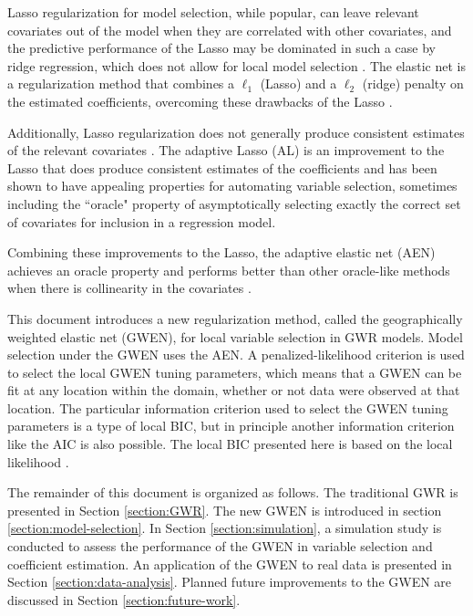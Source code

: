 \documentclass[authoryear, review, 11pt]{elsarticle}
\begin{document}
	Lasso regularization for model selection, while popular, can leave relevant covariates out of the model when they are correlated with other covariates, and the predictive performance of the Lasso may be dominated in such a case by ridge regression, which does not allow for local model selection \citep{Tibshirani:1996}. The elastic net is a regularization method that combines a $\ell_1$ (Lasso) and a $\ell_2$ (ridge) penalty on the estimated coefficients, overcoming these drawbacks of the Lasso \citep{Zou:2005}.
	
	Additionally, Lasso regularization does not generally produce consistent estimates of the relevant covariates \citep{Leng-2006}. The adaptive Lasso (AL) \citep{Zou:2006} is an improvement to the Lasso that does produce consistent estimates of the coefficients and has been shown to have appealing properties for automating variable selection, sometimes including the ``oracle" property of asymptotically selecting exactly the correct set of covariates for inclusion in a regression model.
	
	Combining these improvements to the Lasso, the adaptive elastic net (AEN) achieves an oracle property and performs better than other oracle-like methods when there is collinearity in the covariates \citep{Zou:2009}.
	
	This document introduces a new regularization method, called the geographically weighted elastic net (GWEN), for local variable selection in GWR models. Model selection under the GWEN uses the AEN. A penalized-likelihood criterion is used to select the local GWEN tuning parameters, which means that a GWEN can be fit at any location within the domain, whether or not data were observed at that location. The particular information criterion used to select the GWEN tuning parameters is a type of local BIC, but in principle another information criterion like the AIC is also possible. The local BIC presented here is based on the local likelihood \citep{Loader:1999}.
	
	The remainder of this document is organized as follows. The traditional GWR is presented in Section \ref{section:GWR}. The new GWEN is introduced in section \ref{section:model-selection}. In Section \ref{section:simulation}, a simulation study is conducted to assess the performance of the GWEN in variable selection and coefficient estimation. An application of the GWEN to real data is presented in Section \ref{section:data-analysis}. Planned future improvements to the GWEN are discussed in Section \ref{section:future-work}.
\end{document}

